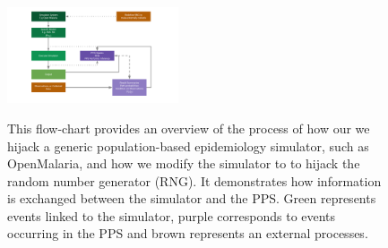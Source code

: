 \documentclass{article}
\begin{document}
\begin{figure}

   \includegraphics[width=0.45\textwidth]{../plots/system.pdf}
  \label{fig:how}
  \caption{This flow-chart provides an overview of the process of how our we hijack a generic population-based epidemiology simulator, such as OpenMalaria, and how we modify the simulator to 
  to hijack the random number generator (RNG). It demonstrates how information is exchanged between the simulator and the PPS. Green represents events linked to the simulator, purple corresponds to 
  events occurring in the PPS and brown represents an external processes.}
\end{figure}
\end{document}
